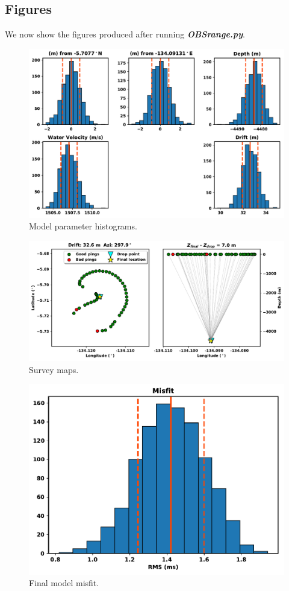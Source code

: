 \documentclass[titlepage]{article}
\begin{document}
  \subsection{Figures}
  We now show the figures produced after running \textit{\textbf{OBSrange.py}}.

  \begin{figure}[!htb]
   \centering
   \includegraphics[width=0.8\linewidth]{histograms.pdf}
   \caption{Model parameter histograms.}
  \end{figure}

  \begin{figure}[!htb]
   \centering
   \includegraphics[width=0.9\linewidth]{maps.pdf}
   \caption{Survey maps.}
  \end{figure}
 
  \begin{figure}[!htb]
   \centering
   \includegraphics[width=0.7\linewidth]{misfit.pdf}
   \caption{Final model misfit.}
  \end{figure}
\end{document}
